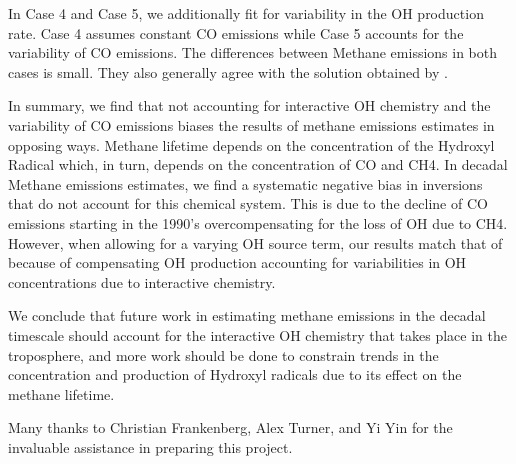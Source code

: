 \documentclass[two column,grl]{AGUTeX}
\begin{document}
\begin{article}
In Case 4 and Case 5, we additionally fit for variability in the OH production rate. Case 4 assumes constant CO emissions while Case 5 accounts for the variability of CO emissions. The differences between Methane emissions in both cases is small. They also generally agree with the solution obtained by \citep{turner_ambiguity_2017}. 

In summary, we find that not accounting for interactive OH chemistry and the variability of CO emissions biases the results of methane emissions estimates in opposing ways. Methane lifetime depends on the concentration of the Hydroxyl Radical which, in turn, depends on the concentration of CO and CH4. In decadal Methane emissions estimates, we find a systematic negative bias in inversions that do not account for this chemical system. This is due to the decline of CO emissions starting in the 1990’s overcompensating for the loss of OH due to CH4. However, when allowing for a varying OH source term, our results match that of \citep{turner_ambiguity_2017} because of compensating OH production accounting for variabilities in OH concentrations due to interactive chemistry. 

We conclude that future work in estimating methane emissions in the decadal timescale should account for the interactive OH chemistry that takes place in the troposphere, and more work should be done to constrain trends in the concentration and production of Hydroxyl radicals due to its effect on the methane lifetime. 





\begin{acknowledgments}
Many thanks to Christian Frankenberg, Alex Turner, and Yi Yin for the invaluable assistance in preparing this project. 
\end{acknowledgments}
{}





\end{article}
\end{document}

